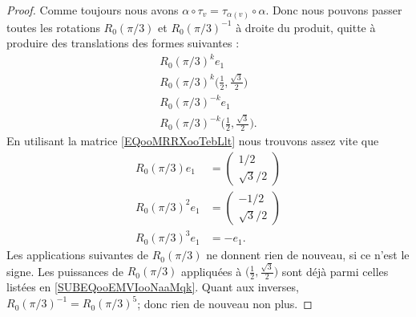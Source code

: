 \begin{proof}
	Comme toujours nous avons \( \alpha\circ\tau_v=\tau_{\alpha(v)}\circ \alpha\). Donc nous pouvons passer toutes les rotations \( R_0(\pi/3)\) et \( R_0(\pi/3)^{-1}\) à droite du produit, quitte à produire des translations des formes suivantes :
	\begin{subequations}
		\begin{align}
			R_0(\pi/3)^ke_1                                              \\
			R_0(\pi/3)^k\big( \frac{ 1 }{2},\frac{ \sqrt{ 3 } }{2} \big) \\
			R_0(\pi/3)^{-k}e_1                                           \\
			R_0(\pi/3)^{-k}\big( \frac{ 1 }{2},\frac{ \sqrt{ 3 } }{2} \big).
		\end{align}
	\end{subequations}
	En utilisant la matrice \eqref{EQooMRRXooTebLlt} nous trouvons assez vite que
	\begin{subequations}        \label{SUBEQooEMVIooNaaMqk}
		\begin{align}
			R_0(\pi/3)e_1   & =\begin{pmatrix}
				                   1/2 \\
				                   \sqrt{ 3 }/2
			                   \end{pmatrix} \\
			R_0(\pi/3)^2e_1 & =\begin{pmatrix}
				                   -1/2 \\
				                   \sqrt{ 3 }/2
			                   \end{pmatrix} \\
			R_0(\pi/3)^3e_1 & =-e_1.
		\end{align}
	\end{subequations}
	Les applications suivantes de \( R_0(\pi/3)\) ne donnent rien de nouveau, si ce n'est le signe. Les puissances de \( R_0(\pi/3)\) appliquées à \( \big( \frac{ 1 }{2},\frac{ \sqrt{ 3 } }{2} \big)\) sont déjà parmi celles listées en \eqref{SUBEQooEMVIooNaaMqk}. Quant aux inverses, \( R_0(\pi/3)^{-1}=R_0(\pi/3)^5\); donc rien de nouveau non plus.


\end{proof}
